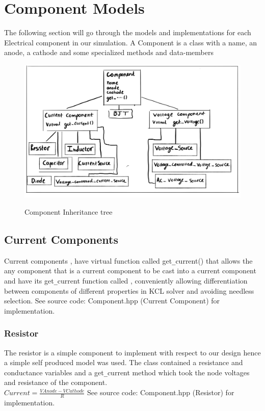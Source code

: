 \documentclass{article}
\begin{document}
\section{Component Models}
The following section will go through the models and implementations for each Electrical component in our simulation.
A Component is a class with a name, an anode, a cathode and some specialized methods and data-members
\begin{figure}[h]
    \caption{Component Inheritance tree}
    \centering
    \includegraphics[width=12cm]{images/Comphpp1.jpg}
    \label{fig:Comp}
\end{figure}

\subsection{Current Components}
Current components , have virtual function called get\verb|_|current() that allows the any component that is a current component to be cast into a current component and have its get\verb|_|current function called , conveniently allowing differentiation between components of different properties in KCL solver and avoiding needless selection.
\bigbreak
See source code: Component.hpp (Current Component) for implementation.
\medbreak


\subsubsection{Resistor}
The resistor is a simple component to implement with respect to our design hence a simple self produced model was used. The class contained a resistance and conductance variables and a get\verb|_|current method which took the node voltages and resistance of the component. \bigbreak\\$Current = \frac{VAnode - VCathode}{R}$
\bigbreak
See source code: Component.hpp (Resistor) for implementation.
\newpage
\end{document}

